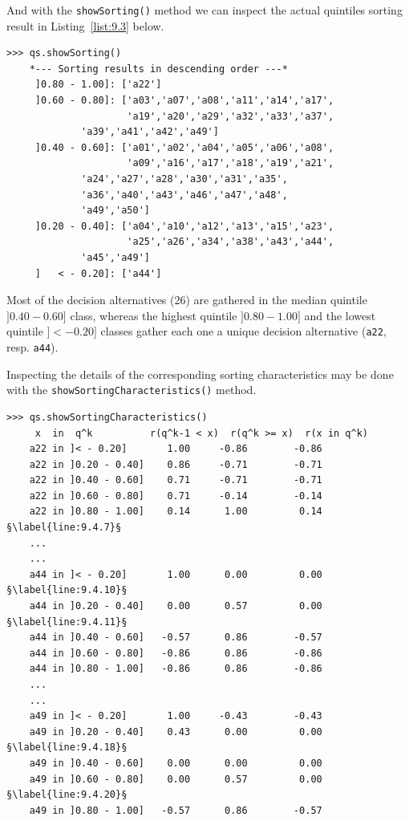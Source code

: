 And with the \texttt{showSorting()} method we can inspect the actual quintiles sorting result in Listing~\ref{list:9.3} below.
\begin{lstlisting}[caption={Computing a quintiles sorting result},label=list:9.3]
>>> qs.showSorting()
    *--- Sorting results in descending order ---*
     ]0.80 - 1.00]: ['a22']
     ]0.60 - 0.80]: ['a03','a07','a08','a11','a14','a17',
                     'a19','a20','a29','a32','a33','a37',
		     'a39','a41','a42','a49']
     ]0.40 - 0.60]: ['a01','a02','a04','a05','a06','a08',
                     'a09','a16','a17','a18','a19','a21',
		     'a24','a27','a28','a30','a31','a35',
		     'a36','a40','a43','a46','a47','a48',
		     'a49','a50']
     ]0.20 - 0.40]: ['a04','a10','a12','a13','a15','a23',
                     'a25','a26','a34','a38','a43','a44',
		     'a45','a49']
     ]   < - 0.20]: ['a44']
   \end{lstlisting}

Most of the decision alternatives (26) are gathered in the median quintile $]0.40 - 0.60]$ class, whereas the highest quintile $]0.80-1.00]$ and the lowest quintile $]< - 0.20]$ classes gather each one a unique decision alternative (\texttt{a22}, resp. \texttt{a44}).

Inspecting the details of the corresponding sorting characteristics may be done with the \texttt{showSortingCharacteristics()} method.
\begin{lstlisting}[caption={Bipolar-valued sorting characteristics (extract)},label=list:9.4,basicstyle=\ttfamily\scriptsize]
>>> qs.showSortingCharacteristics()
     x  in  q^k          r(q^k-1 < x)  r(q^k >= x)  r(x in q^k)
    a22 in ]< - 0.20]	    1.00	 -0.86	      -0.86
    a22 in ]0.20 - 0.40]    0.86	 -0.71	      -0.71
    a22 in ]0.40 - 0.60]    0.71	 -0.71	      -0.71
    a22 in ]0.60 - 0.80]    0.71	 -0.14	      -0.14
    a22 in ]0.80 - 1.00]    0.14	  1.00	       0.14 §\label{line:9.4.7}§
    ...
    ...
    a44 in ]< - 0.20]	    1.00	  0.00	       0.00 §\label{line:9.4.10}§
    a44 in ]0.20 - 0.40]    0.00	  0.57	       0.00 §\label{line:9.4.11}§
    a44 in ]0.40 - 0.60]   -0.57	  0.86	      -0.57
    a44 in ]0.60 - 0.80]   -0.86	  0.86	      -0.86
    a44 in ]0.80 - 1.00]   -0.86	  0.86	      -0.86
    ...
    ...
    a49 in ]< - 0.20]	    1.00	 -0.43	      -0.43
    a49 in ]0.20 - 0.40]    0.43	  0.00	       0.00 §\label{line:9.4.18}§
    a49 in ]0.40 - 0.60]    0.00	  0.00	       0.00
    a49 in ]0.60 - 0.80]    0.00	  0.57	       0.00 §\label{line:9.4.20}§
    a49 in ]0.80 - 1.00]   -0.57	  0.86	      -0.57
\end{lstlisting}

